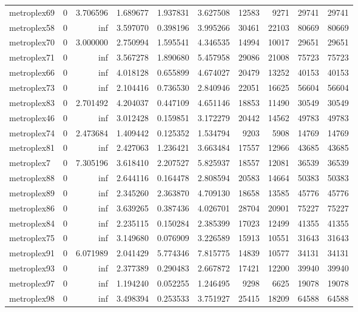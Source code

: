 \begin{longtable}{|l|r|r|r|r|r|r|r|r|r|}
metroplex69 & 0 & 3.706596 & 1.689677 & 1.937831 & 3.627508 & 12583 & 9271 & 29741 & 29741 \\
metroplex58 & 0 & inf & 3.597070 & 0.398196 & 3.995266 & 30461 & 22103 & 80669 & 80669 \\
metroplex70 & 0 & 3.000000 & 2.750994 & 1.595541 & 4.346535 & 14994 & 10017 & 29651 & 29651 \\
metroplex71 & 0 & inf & 3.567278 & 1.890680 & 5.457958 & 29086 & 21008 & 75723 & 75723 \\
metroplex66 & 0 & inf & 4.018128 & 0.655899 & 4.674027 & 20479 & 13252 & 40153 & 40153 \\
metroplex73 & 0 & inf & 2.104416 & 0.736530 & 2.840946 & 22051 & 16625 & 56604 & 56604 \\
metroplex83 & 0 & 2.701492 & 4.204037 & 0.447109 & 4.651146 & 18853 & 11490 & 30549 & 30549 \\
metroplex46 & 0 & inf & 3.012428 & 0.159851 & 3.172279 & 20442 & 14562 & 49783 & 49783 \\
metroplex74 & 0 & 2.473684 & 1.409442 & 0.125352 & 1.534794 & 9203 & 5908 & 14769 & 14769 \\
metroplex81 & 0 & inf & 2.427063 & 1.236421 & 3.663484 & 17557 & 12966 & 43685 & 43685 \\
metroplex7 & 0 & 7.305196 & 3.618410 & 2.207527 & 5.825937 & 18557 & 12081 & 36539 & 36539 \\
metroplex88 & 0 & inf & 2.644116 & 0.164478 & 2.808594 & 20583 & 14664 & 50383 & 50383 \\
metroplex89 & 0 & inf & 2.345260 & 2.363870 & 4.709130 & 18658 & 13585 & 45776 & 45776 \\
metroplex86 & 0 & inf & 3.639265 & 0.387436 & 4.026701 & 28704 & 20901 & 75227 & 75227 \\
metroplex84 & 0 & inf & 2.235115 & 0.150284 & 2.385399 & 17023 & 12499 & 41355 & 41355 \\
metroplex75 & 0 & inf & 3.149680 & 0.076909 & 3.226589 & 15913 & 10551 & 31643 & 31643 \\
metroplex91 & 0 & 6.071989 & 2.041429 & 5.774346 & 7.815775 & 14839 & 10577 & 34131 & 34131 \\
metroplex93 & 0 & inf & 2.377389 & 0.290483 & 2.667872 & 17421 & 12200 & 39940 & 39940 \\
metroplex97 & 0 & inf & 1.194240 & 0.052255 & 1.246495 & 9298 & 6625 & 19078 & 19078 \\
metroplex98 & 0 & inf & 3.498394 & 0.253533 & 3.751927 & 25415 & 18209 & 64588 & 64588 \\

\end{longtable}
